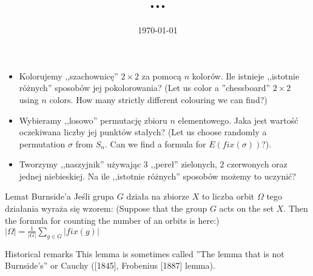 \documentclass{beamer}
\begin{document}
 
\title[Zliczanie orbit grupy]{
  ...
} 
\author{} 
\date{\today}
\begin{frame} 
  \titlepage 
\end{frame} 
\begin{frame}
\begin{itemize}

\item<1->{
Kolorujemy ,,szachownicę'' $2 \times 2$ za pomocą $n$ kolorów.
Ile istnieje ,,istotnie różnych'' sposobów jej pokolorowania?
(Let us color a ''chessboard'' $2 \times 2$ using $n$ colors.
How many strictly different colouring we can find?)
}
\item<2->{
Wybieramy ,,losowo'' permutację zbioru $n$ elementowego.
Jaka jest wartość oczekiwana liczby jej punktów stałych?
(Let us choose randomly a permutation $\sigma$ from $S_n$. Can we
find a formula for $E(fix(\sigma))$?).
}
\item<3->{
Tworzymy ,,naszyjnik'' używając $3$ ,,pereł'' zielonych, $2$ czerwonych oraz jednej niebieskiej.
Na ile ,,istotnie różnych'' sposobów możemy to uczynić?
}
\end{itemize}
\end{frame}


\begin{frame}
  \begin{block}{Lemat Burnside'a}
    Jeśli grupa $G$ działa na zbiorze $X$ to
    liczba orbit $\Omega$ tego działania
    wyraża się wzorem:
    (Suppose that the group $G$ acts on the set $X$. Then
    the formula for counting the number of an orbits
    is here:)
    $|\Omega| = \frac{1}{|G|} \sum_{g\in G} |fix(g)|$
  \end{block}
  \begin{block}{Historical remarks}
    This lemma is sometimes called ''The lemma that is not Burnside's''
    or Cauchy ([1845], Frobenius [1887] lemma).
    \end{block}
\end{frame}
\end{document}
